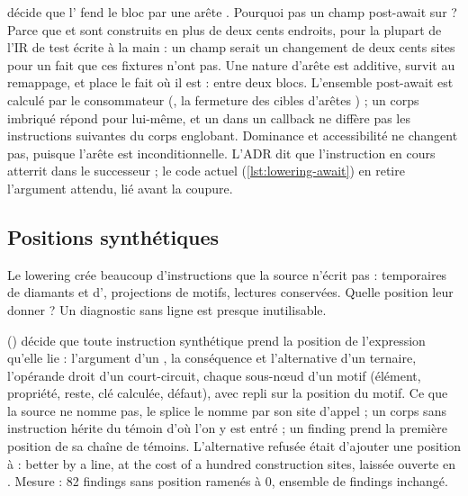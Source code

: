 \begin{decision}
 décide que l' fend le bloc par une arête . Pourquoi pas un champ \og post-await\fg{} sur  ? Parce que  et  sont construits en plus de deux cents endroits, pour la plupart de l'IR de test écrite à la main : un champ serait un changement de deux cents sites pour un fait que ces fixtures n'ont pas. Une nature d'arête est additive, survit au remappage, et place le fait où il est : entre deux blocs. L'ensemble post-await est calculé par le consommateur (, la fermeture des cibles d'arêtes ) ; un corps imbriqué répond pour lui-même, et un  dans un callback ne diffère pas les instructions suivantes du corps englobant. Dominance et accessibilité ne changent pas, puisque l'arête est inconditionnelle. L'ADR dit que l'instruction en cours atterrit dans le successeur ; le code actuel (\cref{lst:lowering-await}) en retire l'argument attendu, lié avant la coupure.
\end{decision}

\subsection{Positions synthétiques}

Le lowering crée beaucoup d'instructions que la source n'écrit pas : temporaires de diamants et d', projections de motifs, lectures conservées. Quelle position leur donner ? Un diagnostic sans ligne est presque inutilisable.

\begin{decision}
 () décide que toute instruction synthétique prend la position de l'expression qu'elle lie : l'argument d'un , la conséquence et l'alternative d'un ternaire, l'opérande droit d'un court-circuit, chaque sous-nœud d'un motif (élément, propriété, reste, clé calculée, défaut), avec repli sur la position du motif. Ce que la source ne nomme pas, le splice le nomme par son site d'appel ; un corps sans instruction hérite du témoin d'où l'on y est entré ; un finding prend la première position de sa chaîne de témoins. L'alternative refusée était d'ajouter une position à  : \og better by a line, at the cost of a hundred construction sites\fg{}, laissée ouverte en . Mesure : 82 findings sans position ramenés à 0, ensemble de findings inchangé.
\end{decision}

